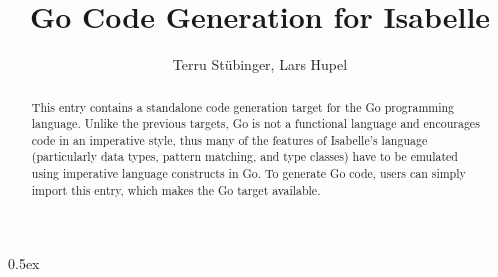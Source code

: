 \documentclass[11pt,a4paper]{report}
\begin{document}
\title{Go Code Generation for Isabelle}
\author{Terru Stübinger, Lars Hupel}
\maketitle

\begin{abstract}
  This entry contains a standalone code generation target for the Go programming language.
  Unlike the previous targets, Go is not a functional language and encourages code in an imperative style, thus many of the features of Isabelle's language (particularly data types, pattern matching, and type classes) have to be emulated using imperative language constructs in Go.
  To generate Go code, users can simply import this entry, which makes the Go target available.
\end{abstract}

\parindent 0pt\parskip 0.5ex


\end{document}
